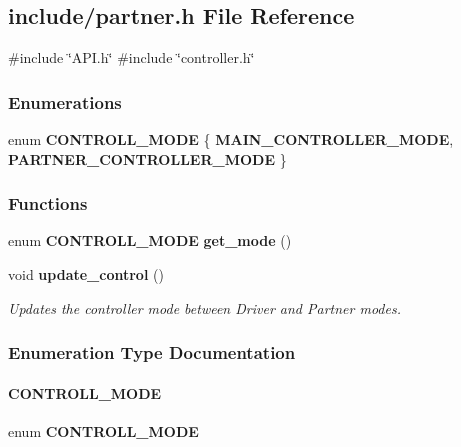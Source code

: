 \subsection{include/partner.h File Reference}
\label{partner_8h}
{\ttfamily \#include \char`\"{}A\+P\+I.\+h\char`\"{}}\newline
{\ttfamily \#include \char`\"{}controller.\+h\char`\"{}}\newline
\subsubsection*{Enumerations}
\begin{DoxyCompactItemize}
\item 
enum \textbf{ C\+O\+N\+T\+R\+O\+L\+L\+\_\+\+M\+O\+DE} \{ \textbf{ M\+A\+I\+N\+\_\+\+C\+O\+N\+T\+R\+O\+L\+L\+E\+R\+\_\+\+M\+O\+DE}, 
\textbf{ P\+A\+R\+T\+N\+E\+R\+\_\+\+C\+O\+N\+T\+R\+O\+L\+L\+E\+R\+\_\+\+M\+O\+DE}
 \}
\end{DoxyCompactItemize}
\subsubsection*{Functions}
\begin{DoxyCompactItemize}
\item 
enum \textbf{ C\+O\+N\+T\+R\+O\+L\+L\+\_\+\+M\+O\+DE} \textbf{ get\+\_\+mode} ()
\item 
void \textbf{ update\+\_\+control} ()
\begin{DoxyCompactList}\small\item\em Updates the controller mode between Driver and Partner modes. \end{DoxyCompactList}\end{DoxyCompactItemize}


\subsubsection{Enumeration Type Documentation}
\mbox{\label{partner_8h_afb2b5bca5ceab5f6efd8bac14a568324}} 
\paragraph{C\+O\+N\+T\+R\+O\+L\+L\+\_\+\+M\+O\+DE}
{\footnotesize\ttfamily enum \textbf{ C\+O\+N\+T\+R\+O\+L\+L\+\_\+\+M\+O\+DE}}

